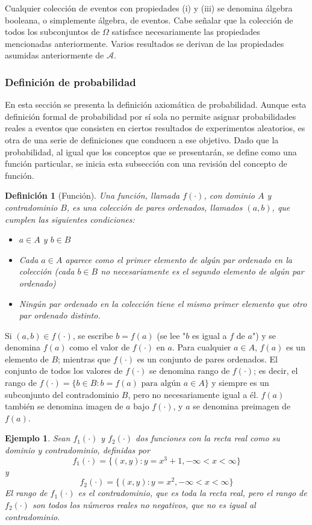 \documentclass[12pt]{article}
\newtheorem*{example}{Ejemplo}
\newtheorem{definition}{Definición}
\begin{document}
Cualquier colección de eventos con propiedades (i) y (iii) se denomina álgebra booleana, o simplemente álgebra, de eventos. Cabe señalar que la colección de todos los subconjuntos de $\Omega$ satisface necesariamente las propiedades mencionadas anteriormente. Varios resultados se derivan de las propiedades asumidas anteriormente de $\mathscr A$.

\subsubsection{Definición de probabilidad} 
En esta sección se presenta la definición axiomática de probabilidad. Aunque esta definición formal de probabilidad por sí sola no permite asignar probabilidades reales a eventos que consisten en ciertos resultados de experimentos aleatorios, es otra de una serie de definiciones que conducen a ese objetivo. Dado que la probabilidad, al igual que los conceptos que se presentarán, se define como una función particular, se inicia esta subsección con una revisión del concepto de función.
\begin{definition}[Función]
    Una función, llamada $f(\cdot)$, con dominio $A$ y contradominio $B$, es una colección de pares ordenados, llamados $(a,b)$, que cumplen las siguientes condiciones: 
    \begin{itemize}
        \item[(i)] $a\in A$ y $b\in B$
        \item[(ii)] Cada $a\in A$ aparece como el primer elemento de algún par ordenado en la colección (cada $b\in B$ no necesariamente es el segundo elemento de algún par ordenado) 
        \item[(iii)] Ningún par ordenado en la colección tiene el mismo primer elemento que otro par ordenado distinto.
    \end{itemize}
\end{definition}
Si $(a,b)\in f(\cdot)$, se escribe $b=f(a)$ (se lee "$b$ es igual a $f$ de $a$") y se denomina $f(a)$ como el valor de $f(\cdot)$ en $a$. Para cualquier $a\in A$, $f(a)$ es un elemento de $B$; mientras que $f(\cdot)$ es un conjunto de pares ordenados. El conjunto de todos los valores de $f(\cdot)$ se denomina rango de $f(\cdot)$; es decir, el rango de $f(\cdot)=\{b\in B:b=f(a) \text{ para algún } a\in A\}$ y siempre es un subconjunto del contradominio $B$, pero no necesariamente igual a él. $f(a)$ también se denomina imagen de $a$ bajo $f(\cdot)$, y $a$ se denomina preimagen de $f(a)$.\\
\begin{example}
    Sean $f_1(\cdot)$ y $f_2(\cdot)$ dos funciones con la recta real como su dominio y contradominio, definidas por 
$$f_1(\cdot)= \{(x,y): y = x^3 +1, -\infty< x< \infty\}$$
y
$$f_2(\cdot)= \{(x,y): y = x^2, -\infty< x< \infty\}$$
El rango de $f_1(\cdot)$ es el contradominio, que es toda la recta real, pero el rango de $f_2(\cdot)$ son todos los números reales no negativos, que no es igual al contradominio.
\end{example}
\end{document}
